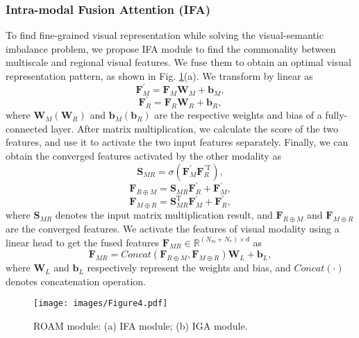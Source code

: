 \documentclass[journal]{IEEEtran}
\begin{document}
\subsubsection{Intra-modal Fusion Attention (IFA)}
To find fine-grained visual representation while solving the visual-semantic imbalance problem, we propose IFA module to find the commonality between multiscale and regional visual features. We fuse them to obtain an optimal visual representation pattern, as shown in Fig. \ref{fig:fig4}(a). We transform by linear as
\begin{equation}
\bm{F}_M^{\prime}= \bm{F}_M \bm{W}_M+\bm{b}_M,
\end{equation}
\begin{equation}
\bm{F}_R^{\prime}= \bm{F}_R \bm{W}_R+\bm{b}_R,
\end{equation}
where $\bm{W}_M (\bm{W}_R)$ and $\bm{b}_M (\bm{b}_R)$ are the respective weights and bias of a fully-connected layer. After matrix multiplication, we calculate the score of the two features, and use it to activate the two input features separately. Finally, we can obtain the converged features activated by the other modality as
\begin{equation}
\bm{S}_{M R} =\sigma \left(\bm{F}_M^{\prime} \bm{F}_{R}^{\prime \mathrm{T}}\right),
\end{equation}
\begin{equation}
\bm{F}_{R \oplus M} =\bm{S}_{M R} \bm{F}_R^{\prime}+\bm{F}_M^{\prime},
\end{equation}
\begin{equation}
\bm{F}_{M \oplus R} = \bm{S}_{M R}^{\mathrm{T}} \bm{F}_M^{\prime}+\bm{F}_R^{\prime},
\end{equation}
where $\bm{S}_{M R}$ denotes the input matrix multiplication result, and $\bm{F}_{R \oplus M}$ and $\bm{F}_{M \oplus R}$ are the converged features. We activate the features of visual modality using a linear head to get the fused features $\bm{F}_{M R} \in \mathbb{R}^{(N_m+N_r) \times d}$ as
\begin{equation}
\bm{F}_{M R}= Concat\left(\bm{F}_{R \oplus M} , \bm{F}_{M \oplus R }\right) \bm{W}_L+\bm{b}_L,
\end{equation}
where $\bm{W}_L$ and $\bm{b}_L$ respectively represent the weights and bias, and $Concat(\cdot)$ denotes concatenation operation.
\begin{figure}[t]
  \centering
  \texttt{[image: images/Figure4.pdf]}
  \caption{ROAM module: (a) IFA module; (b) IGA module.}
\label{fig:fig4}
\end{figure}
\end{document}
